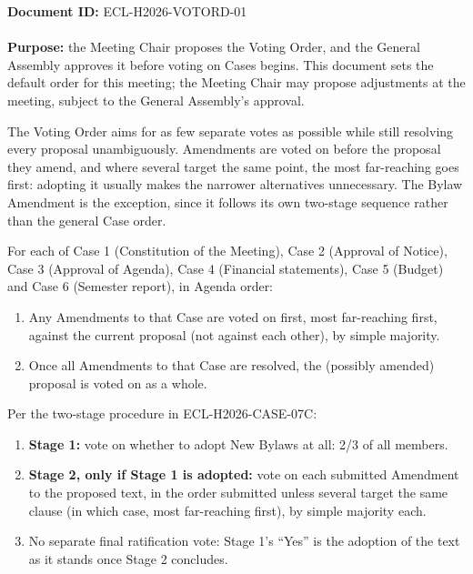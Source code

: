 \documentclass{../../../Common/Latex/Templates/rapport}
\date{\meetingdate, \meetingtime}
\begin{document}
\makecoverpage
\tableofcontents
\reportmainmatter

\noindent\textbf{Document ID:} ECL-H2026-VOTORD-01\\
\meetingline\\
\textbf{Purpose:} the Meeting Chair proposes the Voting Order, and the General Assembly approves it before voting on Cases begins. This document sets the default order for this meeting; the Meeting Chair may propose adjustments at the meeting, subject to the General Assembly's approval.

The Voting Order aims for as few separate votes as possible while still resolving every proposal unambiguously. Amendments are voted on before the proposal they amend, and where several target the same point, the most far-reaching goes first: adopting it usually makes the narrower alternatives unnecessary. The Bylaw Amendment is the exception, since it follows its own two-stage sequence rather than the general Case order.

For each of Case 1 (Constitution of the Meeting), Case 2 (Approval of Notice), Case 3 (Approval of Agenda), Case 4 (Financial statements), Case 5 (Budget) and Case 6 (Semester report), in Agenda order:
\begin{enumerate}
  \item Any Amendments to that Case are voted on first, most far-reaching first, against the current proposal (not against each other), by simple majority.
  \item Once all Amendments to that Case are resolved, the (possibly amended) proposal is voted on as a whole.
\end{enumerate}

Per the two-stage procedure in ECL-H2026-CASE-07C:
\begin{enumerate}
  \item \textbf{Stage 1:} vote on whether to adopt New Bylaws at all: 2/3 of all members.
  \item \textbf{Stage 2, only if Stage 1 is adopted:} vote on each submitted Amendment to the proposed text, in the order submitted unless several target the same clause (in which case, most far-reaching first), by simple majority each.
  \item No separate final ratification vote: Stage 1's ``Yes'' is the adoption of the text as it stands once Stage 2 concludes.
\end{enumerate}
\end{document}
